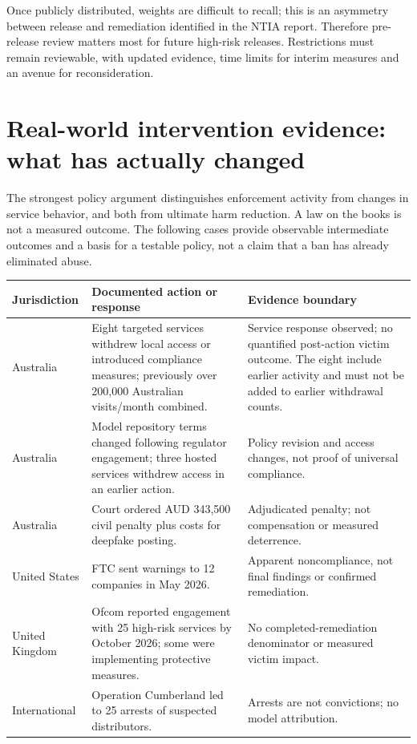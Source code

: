 \documentclass[10pt,a4paper]{article}
\begin{document}
Once publicly distributed, weights are difficult to recall; this is an asymmetry between release and remediation identified in the NTIA report. Therefore pre-release review matters most for future high-risk releases. Restrictions must remain reviewable, with updated evidence, time limits for interim measures and an avenue for reconsideration. \cite{ntia}


\section{Real-world intervention evidence: what has actually changed}
The strongest policy argument distinguishes enforcement activity from changes in service behavior, and both from ultimate harm reduction. A law on the books is not a measured outcome. The following cases provide observable intermediate outcomes and a basis for a testable policy, not a claim that a ban has already eliminated abuse.

\begin{center}\small\begin{tabularx}{\linewidth}{@{}>{\RaggedRight\arraybackslash}p{.17\linewidth}YY@{}}\toprule
\textbf{Jurisdiction} & \textbf{Documented action or response} & \textbf{Evidence boundary}\\\midrule
Australia & Eight targeted services withdrew local access or introduced compliance measures; previously over 200,000 Australian visits/month combined. \cite{ausbill} & Service response observed; no quantified post-action victim outcome. The eight include earlier activity and must not be added to earlier withdrawal counts.\\
Australia & Model repository terms changed following regulator engagement; three hosted services withdrew access in an earlier action. \cite{ausmodels} & Policy revision and access changes, not proof of universal compliance.\\
Australia & Court ordered AUD 343,500 civil penalty plus costs for deepfake posting. \cite{auscourt} & Adjudicated penalty; not compensation or measured deterrence.\\
United States & FTC sent warnings to 12 companies in May 2026. \cite{ftcletters} & Apparent noncompliance, not final findings or confirmed remediation.\\
United Kingdom & Ofcom reported engagement with 25 high-risk services by October 2026; some were implementing protective measures. \cite{ofcomncii} & No completed-remediation denominator or measured victim impact.\\
International & Operation Cumberland led to 25 arrests of suspected distributors. \cite{cumberland} & Arrests are not convictions; no model attribution.\\\bottomrule\end{tabularx}\end{center}
\end{document}
